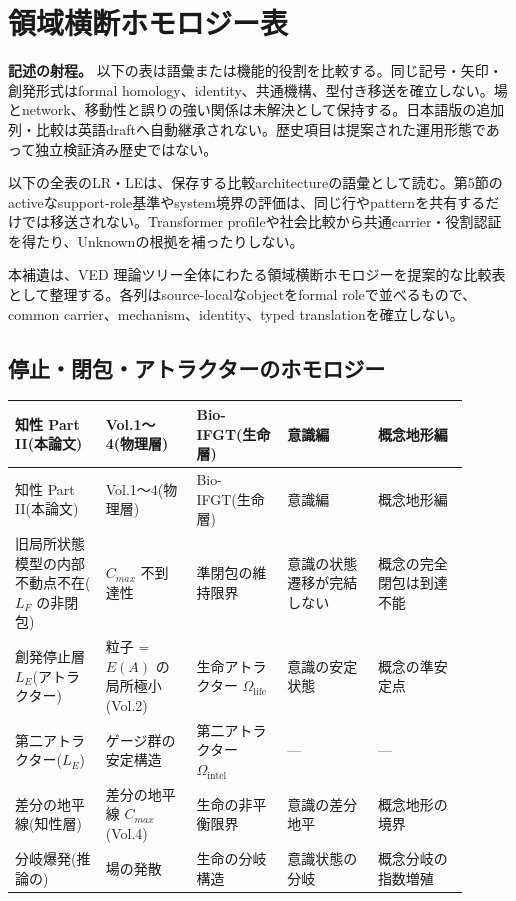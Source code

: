 \section{領域横断ホモロジー表}

\noindent\textbf{記述の射程。} 以下の表は語彙または機能的役割を比較する。同じ記号・矢印・創発形式はformal homology、identity、共通機構、型付き移送を確立しない。場とnetwork、移動性と誤りの強い関係は未解決として保持する。日本語版の追加列・比較は英語draftへ自動継承されない。歴史項目は提案された運用形態であって独立検証済み歴史ではない。

以下の全表のLR・LEは、保存する比較architectureの語彙として読む。第5節のactiveなsupport-role基準やsystem境界の評価は、同じ行やpatternを共有するだけでは移送されない。Transformer profileや社会比較から共通carrier・役割認証を得たり、Unknownの根拠を補ったりしない。



本補遺は、VED 理論ツリー全体にわたる領域横断ホモロジーを提案的な比較表として整理する。各列はsource-localなobjectをformal roleで並べるもので、common carrier、mechanism、identity、typed translationを確立しない。

\bigskip


\subsection{停止・閉包・アトラクターのホモロジー}


\begin{longtable}{@{}p{0.18\linewidth}p{0.18\linewidth}p{0.18\linewidth}p{0.18\linewidth}p{0.18\linewidth}@{}}
\toprule
知性 Part II(本論文) & Vol.1〜4(物理層) & Bio-IFGT(生命層) & 意識編 & 概念地形編 \\
\midrule
\endfirsthead
\toprule
知性 Part II(本論文) & Vol.1〜4(物理層) & Bio-IFGT(生命層) & 意識編 & 概念地形編 \\
\midrule
\endhead
旧局所状態模型の内部不動点不在($L_F$ の非閉包) & $C_{max}$ 不到達性 & 準閉包の維持限界 & 意識の状態遷移が完結しない & 概念の完全閉包は到達不能 \\
創発停止層 $L_E$(アトラクター) & 粒子 = $E(A)$ の局所極小(Vol.2) & 生命アトラクター $\Omega_{\text{life}}$ & 意識の安定状態 & 概念の準安定点 \\
第二アトラクター($L_E$) & ゲージ群の安定構造 & 第二アトラクター $\Omega_{\text{intel}}$ & — & — \\
差分の地平線(知性層) & 差分の地平線 $C_{max}$(Vol.4) & 生命の非平衡限界 & 意識の差分地平 & 概念地形の境界 \\
分岐爆発(推論の) & 場の発散 & 生命の分岐構造 & 意識状態の分岐 & 概念分岐の指数増殖 \\
\bottomrule
\end{longtable}


